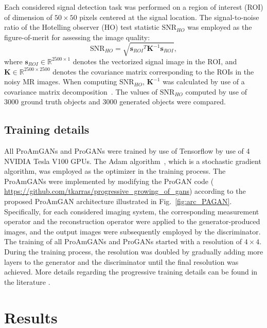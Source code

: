 \documentclass[journal]{IEEEtran}
\renewcommand{\vec}[1]{\mathbf{#1}}
\begin{document}
Each considered signal detection task was performed on a region of interest (ROI) of dimension of $50\times 50$ pixels centered at the signal location.
The signal-to-noise ratio of the Hotelling observer (HO) test statistic $\text{SNR}_{HO}$ was employed as 
the figure-of-merit for assessing the image quality\cite{barrett2013foundations}:
\begin{equation}
\label{eq:snr}
  \text{SNR}_{HO} = \sqrt{{\vec{s}_{ROI}}^T\mathbf{K}^{-1}{\vec{s}_{ROI}}}, 
\end{equation}
where $\vec{s}_{ROI} \in \mathbb{R}^{2500\times 1}$ denotes the vectorized signal image in the ROI, 
and $\mathbf{K} \in \mathbb{R}^{2500\times 2500}$ denotes the covariance matrix corresponding to the ROIs in the noisy MR images.  
When computing 
$\text{SNR}_{HO}$, $\mathbf{K}^{-1}$ was calculated by use of a covariance matrix decomposition~\cite{barrett2013foundations}.
The values of $\text{SNR}_{HO}$  computed by use of 3000 ground truth objects and 3000 generated objects were compared.

\vspace{-0.2cm}
\subsection{Training details}
All ProAmGANs and ProGANs were trained by use of Tensorflow\cite{abadi2016tensorflow} by use of 4 NVIDIA Tesla V100 GPUs.
The Adam algorithm~\cite{kingma2014adam}, which is a stochastic gradient algorithm, was employed as the optimizer in the training process.
The ProAmGANs were implemented by modifying the ProGAN code ( \url{https://github.com/tkarras/progressive_growing_of_gans}) according to the proposed ProAmGAN architecture 
illustrated in Fig.~\ref{fig:arc_PAGAN}. Specifically, for each considered imaging system, the corresponding measurement operator and the reconstruction operator were applied to the generator-produced images, and the output images were subsequently employed by the discriminator.
The training of all ProAmGANs and ProGANs started with a resolution of $4\times 4$.
During the training process, the resolution was doubled by gradually
adding more layers to the generator and the discriminator until the final resolution was achieved.
More details regarding the progressive training details can be found in the literature \cite{karras2017progressive}.

\section{Results}
\label{sec:result}
\end{document}
